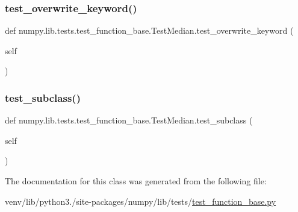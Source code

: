 \subsubsection{\texorpdfstring{test\+\_\+overwrite\+\_\+keyword()}{test\_overwrite\_keyword()}}
{\footnotesize\ttfamily def numpy.\+lib.\+tests.\+test\+\_\+function\+\_\+base.\+Test\+Median.\+test\+\_\+overwrite\+\_\+keyword (\begin{DoxyParamCaption}\item[{}]{self }\end{DoxyParamCaption})}

\mbox{\label{classnumpy_1_1lib_1_1tests_1_1test__function__base_1_1TestMedian_ab2f873094355732d05e08b1038e68e47}} 
\subsubsection{\texorpdfstring{test\+\_\+subclass()}{test\_subclass()}}
{\footnotesize\ttfamily def numpy.\+lib.\+tests.\+test\+\_\+function\+\_\+base.\+Test\+Median.\+test\+\_\+subclass (\begin{DoxyParamCaption}\item[{}]{self }\end{DoxyParamCaption})}



The documentation for this class was generated from the following file\+:\begin{DoxyCompactItemize}
\item 
venv/lib/python3./site-\/packages/numpy/lib/tests/\hyperlink{lib_2tests_2test__function__base_8py}{test\+\_\+function\+\_\+base.\+py}\end{DoxyCompactItemize}
